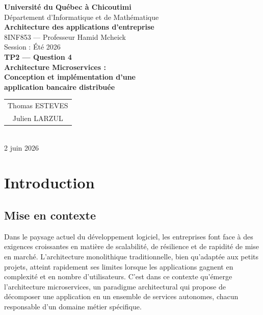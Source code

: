 \documentclass[12pt,a4paper]{article}
\begin{document}
\begin{titlepage}
\centering
\vspace*{1cm}

{\Large\textbf{Université du Québec à Chicoutimi}}\\[0.3cm]
{\large Département d'Informatique et de Mathématique}\\[2cm]

{\large\textbf{Architecture des applications d'entreprise}}\\[0.2cm]
{\large 8INF853 --- Professeur Hamid Mcheick}\\[0.2cm]
{\large Session : Été 2026}\\[2.5cm]

{\LARGE\textbf{TP2 --- Question 4}}\\[0.5cm]
{\Large\textbf{Architecture Microservices :}}\\[0.2cm]
{\Large\textbf{Conception et implémentation d'une}}\\[0.2cm]
{\Large\textbf{application bancaire distribuée}}\\[3cm]

{\large
\begin{tabular}{c}
Thomas ESTEVES\\
Julien LARZUL\\
\end{tabular}
}\\[3cm]

{\large 2 juin 2026}

\end{titlepage}

\newpage
\tableofcontents
\newpage

\section{Introduction}

\subsection{Mise en contexte}

Dans le paysage actuel du développement logiciel, les entreprises font face à des exigences croissantes en matière de scalabilité, de résilience et de rapidité de mise en marché. L'architecture monolithique traditionnelle, bien qu'adaptée aux petits projets, atteint rapidement ses limites lorsque les applications gagnent en complexité et en nombre d'utilisateurs. C'est dans ce contexte qu'émerge l'architecture microservices, un paradigme architectural qui propose de décomposer une application en un ensemble de services autonomes, chacun responsable d'un domaine métier spécifique.
\end{document}
